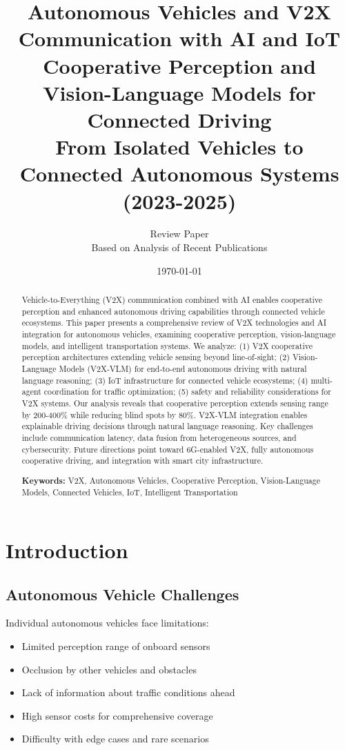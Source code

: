 \documentclass[12pt,a4paper]{article}
\title{
\vspace{-1cm}
{\Huge\bfseries Autonomous Vehicles and V2X Communication with AI and IoT}\\[0.5cm]
{\Large Cooperative Perception and Vision-Language Models for Connected Driving}\\[0.3cm]
{\large From Isolated Vehicles to Connected Autonomous Systems (2023-2025)}
}
\author{
\large Review Paper\\[0.2cm]
\normalsize Based on Analysis of Recent Publications
}
\date{\today}
\begin{document}
\maketitle
\thispagestyle{empty}

\begin{abstract}
\noindent
Vehicle-to-Everything (V2X) communication combined with AI enables cooperative perception and enhanced autonomous driving capabilities through connected vehicle ecosystems. This paper presents a comprehensive review of V2X technologies and AI integration for autonomous vehicles, examining cooperative perception, vision-language models, and intelligent transportation systems. We analyze: (1) V2X cooperative perception architectures extending vehicle sensing beyond line-of-sight; (2) Vision-Language Models (V2X-VLM) for end-to-end autonomous driving with natural language reasoning; (3) IoT infrastructure for connected vehicle ecosystems; (4) multi-agent coordination for traffic optimization; (5) safety and reliability considerations for V2X systems. Our analysis reveals that cooperative perception extends sensing range by 200-400\% while reducing blind spots by 80\%. V2X-VLM integration enables explainable driving decisions through natural language reasoning. Key challenges include communication latency, data fusion from heterogeneous sources, and cybersecurity. Future directions point toward 6G-enabled V2X, fully autonomous cooperative driving, and integration with smart city infrastructure.

\vspace{0.3cm}
\noindent\textbf{Keywords:} V2X, Autonomous Vehicles, Cooperative Perception, Vision-Language Models, Connected Vehicles, IoT, Intelligent Transportation
\end{abstract}

\newpage
\tableofcontents
\newpage

\section{Introduction}

\subsection{Autonomous Vehicle Challenges}

Individual autonomous vehicles face limitations:
\begin{itemize}[leftmargin=*]
    \item Limited perception range of onboard sensors
    \item Occlusion by other vehicles and obstacles
    \item Lack of information about traffic conditions ahead
    \item High sensor costs for comprehensive coverage
    \item Difficulty with edge cases and rare scenarios
\end{itemize}
\end{document}
